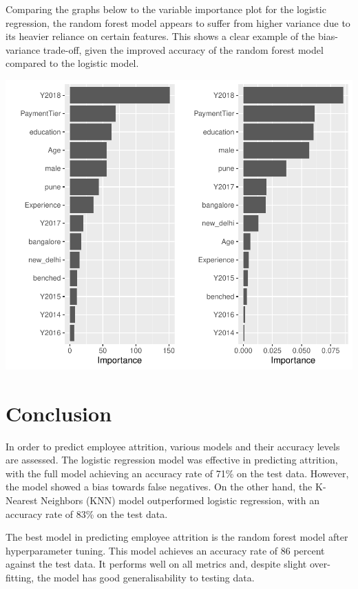 \documentclass[11pt,preprint, authoryear]{elsarticle}
\numberwithin{equation}{section}
\numberwithin{figure}{section}
\numberwithin{table}{section}
\begin{document}
Comparing the graphs below to the variable importance plot for the
logistic regression, the random forest model appears to suffer from
higher variance due to its heavier reliance on certain features. This
shows a clear example of the bias-variance trade-off, given the improved
accuracy of the random forest model compared to the logistic model.

\includegraphics{Final_project_files/figure-latex/unnamed-chunk-11-1.pdf}

\hfill

\hypertarget{conclusion}{%
\section*{Conclusion}\label{conclusion}}

In order to predict employee attrition, various models and their
accuracy levels are assessed. The logistic regression model was
effective in predicting attrition, with the full model achieving an
accuracy rate of 71\% on the test data. However, the model showed a bias
towards false negatives. On the other hand, the K-Nearest Neighbors
(KNN) model outperformed logistic regression, with an accuracy rate of
83\% on the test data.

The best model in predicting employee attrition is the random forest
model after hyperparameter tuning. This model achieves an accuracy rate
of 86 percent against the test data. It performs well on all metrics
and, despite slight over-fitting, the model has good generalisability to
testing data.
\end{document}

